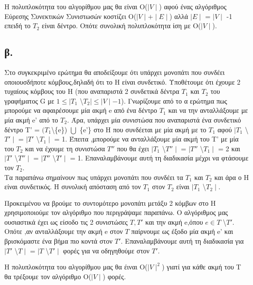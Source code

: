 \documentclass[12pt,a4paper]{article}
\begin{document}
Η πολυπλοκότητα του αλγορίθμου μας θα είναι O($\mid V \mid$) αφού ένας αλγόριθμος Εύρεσης Συνεκτικών Συνιστωσών  κοστίζει Ο($\mid V \mid + \mid Ε \mid$) αλλά $\mid Ε \mid$ = $\mid V \mid$ -1 επειδή το $Τ_2$ είναι δέντρο. Οπότε συνολική πολυπλοκότητα ίση με O($\mid V \mid$).\\

\subsection*{β.}
Στο συγκεκριμένο ερώτημα θα αποδείξουμε ότι υπάρχει μονοπάτι που συνδέει οποιουσδήποτε κόμβους,δηλαδή ότι το Η είναι συνδετικό. Υποθέτουμε ότι έχουμε 2 τυχαίους κόμβους του H (που αναπαριστά 2 συνδετικά δέντρα $Τ_1$ και $T_2$ του γραφήματος G με $1 \le \mid T_1$ \textbackslash $T_2 \mid \le \mid V \mid -1$). Γνωρίζουμε από το α ερώτημα πως μπορούμε να αφαιρέσουμε μία ακμή e από ένα δέντρο $T_1$ και να την ανταλλάξουμε με μία ακμή e' από το $T_2$. Άρα, υπάρχει μία συνιστώσα που αναπαριστά ένα συνδετικό δέντρο T' = $(T_1 $\textbackslash \{e\}) $\bigcup$ \{e'\} στο Η που συνδέεται με μία ακμή με το $Τ_1$ αφού $\mid T_1$ \textbackslash $T' \mid$ = $\mid Τ'$ \textbackslash $T_1 \mid$ = 1. Έπειτα ,μπορούμε να ανταλλάξουμε μία ακμή του Τ' με μία του $Τ_2$ και να έχουμε τη συνιστώσα $Τ''$ που θα έχει $\mid T_1$ \textbackslash $T'' \mid$ = $\mid Τ''$ \textbackslash $T_1 \mid$ = 2 και $\mid T'$ \textbackslash $T'' \mid$ = $\mid Τ''$ \textbackslash $T' \mid$ = 1. Επαναλαμβάνουμε αυτή τη διαδικασία μέχρι να φτάσουμε τον $Τ_2$. \\ Τα παραπάνω σημαίνουν πως υπάρχει μονοπάτι που συνδέει τα $Τ_1$ και $Τ_2$ και άρα ο Η είναι συνδετικός. Η συνολική απόσταση από τον $Τ_1$ στον $Τ_2$ είναι $\mid T_1$ \textbackslash $T_2 \mid$.\\
\par Προκειμένου να βρούμε το συντομότερο μονοπάτι μετάξυ 2 κόμβων στο H χρησιμοποιούμε τον αλγόριθμο που περιγράψαμε παραπάνω.  Ο αλγόριθμος μας ουσιαστικά έχει ως είσοδο τις 2 συνιστώσες $T,T'$ και την ακμή e,όπου $e \in T$ \textbackslash $T'$. Οπότε ,αν ανταλλάξουμε την ακμή e στον $T$ παίρνουμε ως έξοδο μία ακμή e' και βρισκόμαστε ένα βήμα πιο κοντά στον $Τ'$. Επαναλαμβάνουμε αυτή τη διαδικασία για $\mid T'$ \textbackslash $T \mid$ = $\mid Τ$ \textbackslash $T' \mid$ φορές για να οδηγηθούμε στον $Τ'$. \\
\par Η πολυπλοκότητα του αλγορίθμου μας θα έιναι Ο($\mid V\mid^2$) γιατί για κάθε ακμή του Τ θα τρέξουμε τον αλγόριθμο Ο($\mid V\mid$) φορές.
\end{document}
